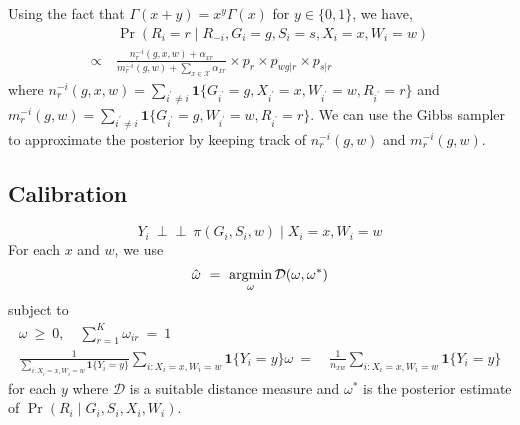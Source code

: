 \documentclass[11pt]{article}
\theoremstyle{plain}
\newcommand{\ind}{\mbox{$\perp\!\!\!\perp$}}
\newcommand{\argmin}{\operatornamewithlimits{argmin}}
\newcommand\spacingset[1]{\renewcommand{\baselinestretch}%
  {#1}\small\normalsize}
\newcommand{\cX}{\mathcal{X}}
\begin{document}
Using the fact that $\Gamma(x+y)=x^y\Gamma(x)$ for $y \in \{0,1\}$, we
have,
\begin{align}
  & \Pr(R_i = r \mid R_{-i}, G_i = g, S_i = s, X_i = x, W_i = w) \\
  \propto \ &
              \frac{n_r^{-i}(g,x,w)+\alpha_{xr}}{m_r^{-i}(g,w)+\sum_{x
              \in \cX}\alpha_{xr}} \times p_r \times p_{wg|r}
              \times p_{s|r}
\end{align}
where
$n_r^{-i}(g,x,w) = \sum_{i^\prime\ne i} \mathbf{1}\{G_{i^\prime} = g,
X_{i^\prime} = x, W_{i^\prime} = w, R_{i^\prime} = r\}$ and
$m_r^{-i}(g,w)=\sum_{i^\prime\ne i} \mathbf{1}\{G_{i^\prime} = g,
W_{i^\prime} = w, R_{i^\prime} = r\}$.  We can use the Gibbs sampler
to approximate the posterior by keeping track of $n_r^{-i}(g,w)$ and
$m_r^{-i}(g,w)$.

\subsection{Calibration}

\begin{equation}
  Y_i \ \ind \ \pi(G_i, S_i, w) \mid X_i = x, W_i = w
\end{equation}
For each $x$ and $w$, we use
\begin{equation}
\hat{\omega} \ = \  \argmin_\omega \mathcal{D}(\omega, \omega^\ast)
\end{equation}
subject to
\begin{align}
  \omega \ \ge \ 0, \quad \sum_{r=1}^K \omega_{ir} \ = \ 1 & \\
  \frac{1}{\sum_{i: X_i = x, W_i =w} \mathbf{1}\{Y_i = y\}} \sum_{i:
  X_i  = x, W_i =w}
  \mathbf{1}\{Y_i = y\} \omega \ = \ & \frac{1}{n_{xw}} \sum_{i: X_i = x, W_i =w} \mathbf{1}\{Y_i = y\}
\end{align}
for each $y$ where $\mathcal{D}$ is a suitable distance measure and
$\omega^\ast$ is the posterior estimate of
$\Pr(R_i \mid G_i, S_i, X_i, W_i)$.

\spacingset{1.5}

\end{document}
